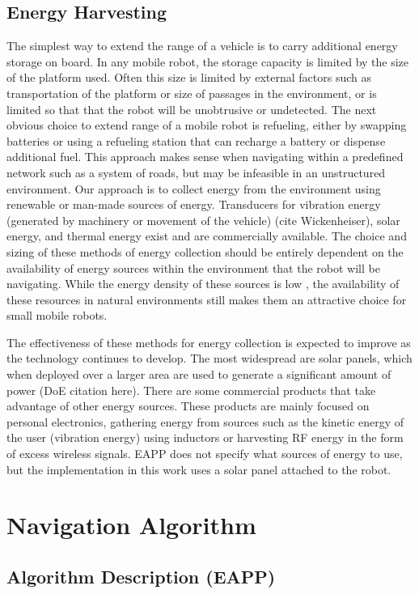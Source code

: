 \documentclass[journal]{IEEEtran}
\begin{document}
\subsection{Energy Harvesting}
The simplest way to extend the range of a vehicle is to carry additional energy storage on board. 
In any mobile robot, the storage capacity is limited by the size of the platform used. 
Often this size is limited by external factors such as transportation of the platform or size of passages in the environment, or is limited so that that the robot will be unobtrusive or undetected. 
The next obvious choice to extend range of a mobile robot is refueling, either by swapping batteries or using a refueling station that can recharge a battery or dispense additional fuel. 
This approach makes sense when navigating within a predefined network such as a system of roads, but may be infeasible in an unstructured environment. 
Our approach is to collect energy from the environment using renewable or man-made sources of energy. 
Transducers for vibration energy (generated by machinery or movement of the vehicle) (cite Wickenheiser), solar energy, and thermal energy exist and are commercially available. 
The choice and sizing of these methods of energy collection should be entirely dependent on the availability of energy sources within the environment that the robot will be navigating. 
While the energy density of these sources is low \cite{ Layton}, the availability of these resources in natural environments still makes them an attractive choice for small mobile robots. 

The effectiveness of these methods for energy collection is expected to improve as the technology continues to develop. 
The most widespread are solar panels, which when deployed over a larger area are used to generate a significant amount of power (DoE citation here). 
There are some commercial products that take advantage of other energy sources. 
These products are mainly focused on personal electronics, gathering energy from sources such as the kinetic energy of the user (vibration energy) using inductors or harvesting RF energy in the form of excess wireless signals. 
EAPP does not specify what sources of energy to use, but the implementation in this work uses a solar panel attached to the robot.

\section{Navigation Algorithm}
\subsection{Algorithm Description (EAPP)}
\end{document}
